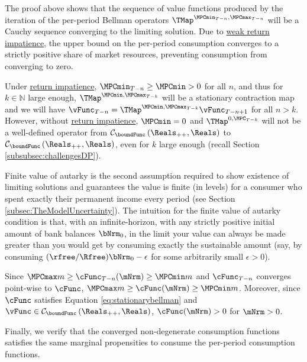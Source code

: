\documentclass[BufferStockTheory]{subfiles}
\begin{document}
The proof above shows that the sequence of value functions produced by the iteration of the per-period Bellman operators $\TMap^{\MPCmin_{T-n}, \MPCmax_{T-n}}$  will be a Cauchy sequence converging to the limiting solution. Due to \hyperlink{WRIC}{weak return impatience}, the upper bound on the per-period consumption converges to a strictly positive share of market resources, preventing consumption from converging to zero. 



\begin{remark}
Under \hyperlink{RIC}{return impatience}, $\MPCmin_{T-n}\geq \MPCmin>0$ for all $n$, and thus for $k\in \mathbb{N}$ large enough, $\TMap^{\MPCmin, \MPCmax_{T-k}}$ will be a stationary contraction map and we will  have $\vFunc_{T-n} = \TMap^{\MPCmin, \MPCmax_{T-k}}\vFunc_{T-n+1}$ for all $n>k$. However, without \hyperlink{RIC}{return impatience}, $\MPCmin = 0$ and $\TMap^{0, \MPC_{T-k}}$ will not be a well-defined operator from  $\mathcal{C}_{\boundFunc }\left(\Reals_{++},\Reals\right)$ to $\mathcal{C}_{\boundFunc }\left(\Reals_{++},\Reals\right)$, even for $k$ large enough (recall Section \ref{subsubsec:challengesDP}).
\end{remark}


Finite value of autarky is the second assumption required to show existence of limiting solutions and guarantees the value is finite (in levels) for a consumer who spent exactly their permanent income every period (see Section \ref{subsec:TheModelUncertainty}). The intuition for the finite value of autarky condition is that, with an infinite-horizon, with any strictly positive initial amount of bank balances $\bNrm_{0}$, in the limit your value can always be made greater than you would get by consuming exactly the sustainable amount (say, by consuming $(\rfree/\Rfree)\bNrm_{0}-\epsilon$ for some arbitrarily small $\epsilon>0$).

\begin{remark}\label{remark:cStatStrctPos}
Since $\MPCmax m \geq \cFunc_{T-n}(\mNrm)\geq \MPCmin m$ and $\cFunc_{T-n}$ converges point-wise to $\cFunc$, $\MPCmax m \geq \cFunc(\mNrm)\geq \MPCmin m$. Moreover, since $\cFunc$ satisfies  Equation \eqref{eq:stationarybellman} and $\vFunc \in \mathcal{C}_{\boundFunc }\left(\Reals_{++},\Reals\right) $, $\cFunc(\mNrm)>0$ for $\mNrm>0$. 
\end{remark}

Finally, we verify that the converged non-degenerate consumption functions satisfies the same marginal propensities to consume the per-period consumption functions.
\end{document}
